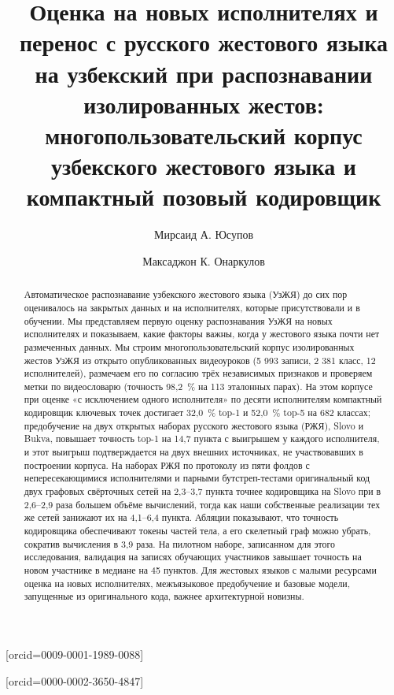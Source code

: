 \documentclass[a4paper,fleqn]{cas-dc}
\newcommand{\authA}{Мирсаид А. Юсупов}
\newcommand{\authB}{Максаджон К. Онаркулов}
\begin{document}
\let\WriteBookmarks\relax
\def\floatpagepagefraction{1}
\def\textpagefraction{.001}
\title[mode=title]{Оценка на новых исполнителях и перенос с русского жестового языка на узбекский при распознавании изолированных жестов: многопользовательский корпус узбекского жестового языка и компактный позовый кодировщик}
\author[1]{\authA}[orcid=0009-0001-1989-0088]
\cormark[1]
\author[2]{\authB}[orcid=0000-0002-3650-4847]
\begin{abstract}
Автоматическое распознавание узбекского жестового языка (УзЖЯ) до сих пор оценивалось на закрытых данных и на исполнителях, которые присутствовали и в обучении. Мы представляем первую оценку распознавания УзЖЯ на новых исполнителях и показываем, какие факторы важны, когда у жестового языка почти нет размеченных данных. Мы строим многопользовательский корпус изолированных жестов УзЖЯ из открыто опубликованных видеоуроков (5 993 записи, 2 381 класс, 12 исполнителей), размечаем его по согласию трёх независимых признаков и проверяем метки по видеословарю (точность 98,2~\% на 113 эталонных парах). На этом корпусе при оценке «с исключением одного исполнителя» по десяти исполнителям компактный кодировщик ключевых точек достигает 32,0~\% top-1 и 52,0~\% top-5 на 682 классах; предобучение на двух открытых наборах русского жестового языка (РЖЯ), Slovo и Bukva, повышает точность top-1 на 14,7 пункта с выигрышем у каждого исполнителя, и этот выигрыш подтверждается на двух внешних источниках, не участвовавших в построении корпуса. На наборах РЖЯ по протоколу из пяти фолдов с непересекающимися исполнителями и парными бутстреп-тестами оригинальный код двух графовых свёрточных сетей на 2,3–3,7 пункта точнее кодировщика на Slovo при в 2,6–2,9 раза большем объёме вычислений, тогда как наши собственные реализации тех же сетей занижают их на 4,1–6,4 пункта. Абляции показывают, что точность кодировщика обеспечивают токены частей тела, а его скелетный граф можно убрать, сократив вычисления в 3,9 раза. На пилотном наборе, записанном для этого исследования, валидация на записях обучающих участников завышает точность на новом участнике в медиане на 45 пунктов. Для жестовых языков с малыми ресурсами оценка на новых исполнителях, межъязыковое предобучение и базовые модели, запущенные из оригинального кода, важнее архитектурной новизны.
\end{abstract}
\end{document}
